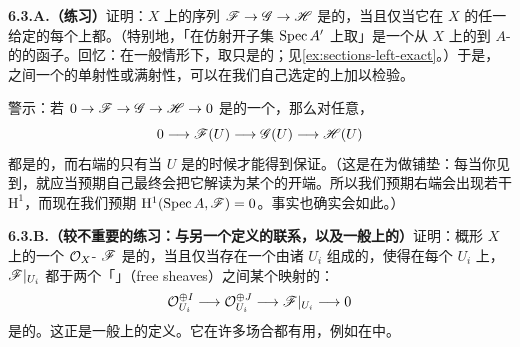 \textbf{6.3.A.（练习）}\quad 证明：$X$ 上\trQCSheaf{}的序列 $\mathscr{F}\to\mathscr{G}\to\mathscr{H}$ 是\trExact{}的，当且仅当它在 $X$ 的任一给定\trAffine\trCover{}的每个\trOpenSet{}上都\trExact。（特别地，「在仿射开子集 $\operatorname{Spec} A'$ 上取\trSection」是一个从 $X$ 上\trQCSheaf{}的\trCategory{}到 $A$-\trModule{}的\trCategory{}的\trExact{}函子。回忆：在一般情形下，取\trSection{}只是\trLeftExact{}的；见\cref{ex:sections-left-exact}。）于是，\trQCSheaf{}之间一个\trMorphism{}的单射性或满射性，可以在我们自己选定的\trAffine\trCover{}上加以检验。

警示：若 $0\to\mathscr{F}\to\mathscr{G}\to\mathscr{H}\to 0$ 是\trQCSheaf{}的一个\trExactSequence，那么对任意\trOpenSet，
\[
0\longrightarrow\mathscr{F}(U)\longrightarrow\mathscr{G}(U)\longrightarrow\mathscr{H}(U)
\]
都是\trExact{}的，而右端的\trExactness{}只有当 $U$ 是\trAffine{}的时候才能得到保证。（这是在为\trCohomology{}做铺垫：每当你见到\trLeftExactness，就应当预期自己最终会把它解读为某个\trLongExactSequence{}的开端。所以我们预期右端会出现若干 $\mathrm{H}^1$，而现在我们预期 $\mathrm{H}^1(\operatorname{Spec} A,\mathscr{F})=0$。事实也确实会如此。）

\textbf{6.3.B.（较不重要的练习：与另一个定义的联系，以及一般\trRingedSpace{}上的\trQCSheaf）}\quad 证明：概形 $X$ 上的一个 $\mathcal{O}_X$-\trModule{} $\mathscr{F}$ 是\trQC{}的，当且仅当存在一个由诸 $U_i$ 组成的\trOpenCover，使得在每个 $U_i$ 上，$\mathscr{F}|_{U_i}$ 都\trIsomorphic{}于两个「\trFreeSheaf{}」（free sheaves）之间某个映射的\trCokernel：
\[
\mathcal{O}_{U_i}^{\oplus I}\longrightarrow\mathcal{O}_{U_i}^{\oplus J}\longrightarrow\mathscr{F}|_{U_i}\longrightarrow 0
\]
是\trExact{}的。这正是一般\trRingedSpace{}上\trQCSheaf{}的定义。它在许多场合都有用，例如在\trComplexAnalyticGeometry{}中。
